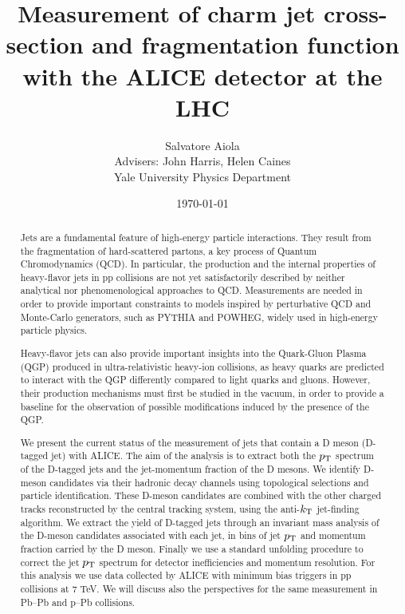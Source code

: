 \documentclass[12pt, a4paper, twoside, titlepage]{article}
\title{Measurement of charm jet cross-section and fragmentation function
with the ALICE detector at the LHC}
\author{Salvatore Aiola  \\
	Advisers: John Harris, Helen Caines \\
	Yale University Physics Department
	}
\date{\today}
\begin{document}
\maketitle


\begin{abstract}
Jets are a fundamental feature of high-energy particle interactions. 
They result from the fragmentation of hard-scattered partons, 
a key process of Quantum Chromodynamics (QCD). 
In particular, the production and the internal properties of heavy-flavor jets 
in pp collisions are not yet satisfactorily described by neither analytical nor 
phenomenological approaches to QCD. Measurements are needed
in order to provide important constraints to models inspired by perturbative QCD 
and Monte-Carlo generators, such as PYTHIA and POWHEG, widely used in high-energy particle physics.

Heavy-flavor jets can also provide important insights into the Quark-Gluon Plasma (QGP)
produced in ultra-relativistic heavy-ion collisions, as heavy quarks are predicted
to interact with the QGP differently compared to light quarks and gluons. 
However, their production mechanisms must first be studied in the vacuum, 
in order to provide a baseline for the observation of possible modifications induced by the presence of the QGP. 

We present the current status of the measurement of jets that contain a D meson (D-tagged jet) with \mbox{ALICE}.
The aim of the analysis is to extract both the $p_{\rm T}$ spectrum of the D-tagged jets and the jet-momentum fraction of the D mesons. 
We identify D-meson candidates via their hadronic decay channels using topological selections and particle identification.
These D-meson candidates are combined with the other charged tracks reconstructed by the central tracking system, 
using the anti-$k_{\rm T}$ jet-finding algorithm.
We extract the yield of D-tagged jets through an invariant mass analysis of the D-meson candidates associated with each jet, 
in bins of jet $p_{\rm T}$ and momentum fraction carried by the D meson. Finally we use a standard unfolding procedure 
to correct the jet $p_{\rm T}$ spectrum for detector inefficiencies and momentum resolution. For this analysis we use data collected
by ALICE with minimum bias triggers in pp collisions at 7 TeV. We will discuss also
the perspectives for the same measurement in Pb--Pb and p--Pb collisions.
\end{abstract}
\end{document}
